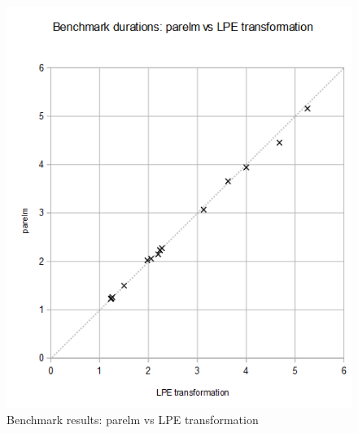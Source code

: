 \begin{figure}[!ht]
\begin{center}
\includegraphics[width=0.5\linewidth]{charts/parelm-vs-lpe-only}
\caption{Benchmark results: parelm vs LPE transformation}
\label{parelm-vs-lpe-only:fig}
\end{center}
\end{figure}

